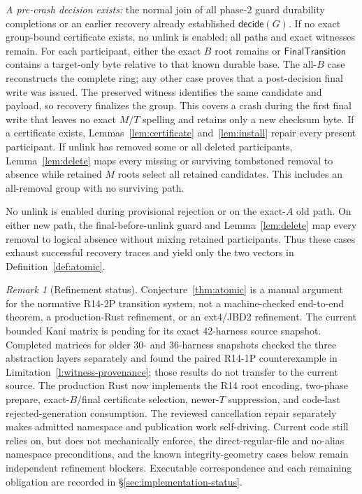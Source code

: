 \documentclass[10pt,twocolumn]{article}
\theoremstyle{remark}
\newtheorem{remark}{Remark}
\begin{document}
\emph{A pre-crash decision exists:} the normal join of all phase-2 guard durability completions or
an earlier recovery already established $\mathsf{decide}(G)$. If no exact group-bound certificate
exists, no unlink is enabled; all paths and exact witnesses remain. For each participant, either the
exact $B$ root remains or $\mathsf{FinalTransition}$ contains a target-only byte relative to that
known durable base. The all-$B$ case reconstructs the complete ring; any other case proves that a
post-decision final write was issued. The preserved witness identifies the same candidate and
payload, so recovery finalizes the group. This covers a crash during the first final write that
leaves no exact $M/T$ spelling and retains only a new checksum byte. If a
certificate exists, Lemmas~\ref{lem:certificate} and~\ref{lem:install} repair every present
participant. If unlink has removed some or all deleted participants, Lemma~\ref{lem:delete} maps
every missing or surviving tombstoned removal to absence while retained $M$ roots select all
retained candidates. This includes an all-removal group with no surviving path.

No unlink is enabled during provisional rejection or on the exact-$A$ old path. On either new path,
the final-before-unlink guard and Lemma~\ref{lem:delete} map every removal to logical absence without
mixing retained participants. Thus these cases exhaust successful recovery traces and yield only
the two vectors in Definition~\ref{def:atomic}.

\begin{remark}[Refinement status]
Conjecture~\ref{thm:atomic} is a manual argument for the normative R14-2P transition system, not a
machine-checked end-to-end theorem, a production-Rust refinement, or an ext4/JBD2 refinement. The
current bounded Kani matrix is pending for its exact 42-harness source snapshot. Completed matrices
for older 30- and 36-harness snapshots checked the three abstraction layers separately and found
the paired R14-1P counterexample in Limitation~\ref{l:witness-provenance}; those results do not
transfer to the current source. The production Rust now implements the R14 root encoding,
two-phase prepare, exact-$B$/final certificate selection, newer-$T$ suppression, and code-last
rejected-generation consumption. The reviewed cancellation repair separately makes admitted
namespace and publication work self-driving. Current code still relies on, but does not
mechanically enforce, the direct-regular-file and no-alias namespace preconditions, and the known
integrity-geometry cases below remain independent refinement blockers. Executable correspondence
and each remaining obligation are recorded in
\S\ref{sec:implementation-status}.
\end{remark}
\end{document}
